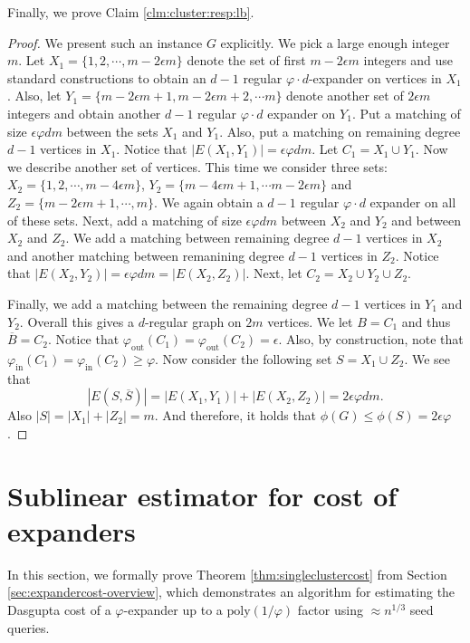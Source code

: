 \documentclass[letterpaper,11pt]{article}
\theoremstyle{plain}
\theoremstyle{definition}
\theoremstyle{remark}
\newcommand{\e}{\epsilon}
\newcommand{\poly}{\text{poly}}
\begin{document}
Finally, we prove Claim \ref{clm:cluster:resp:lb}. 
\clmclusterresp*
\begin{proof}
	We present such an instance $G$ explicitly. We pick a large enough integer $m$.
	Let $X_1 = \{1, 2, \cdots, m - 2 \e m\}$ denote the set of first $m - 2 \e m$ integers
	and use standard constructions to obtain an $d-1$ regular $\varphi \cdot d$-expander on vertices
	in $X_1$. Also, let $Y_1 = \{m - 2 \e m + 1, m -2\e m + 2, \cdots m\}$ denote
another set of $2 \e m$ integers and obtain another $d-1$ regular $\varphi \cdot d$ expander on 
	$Y_1$. Put a matching of size $\e \varphi dm$ between the sets $X_1$ and $Y_1$. Also, put 
	a matching on remaining degree $d-1$ vertices in $X_1$. Notice that $|E(X_1,Y_1)| = \e \varphi dm$.
	Let $C_1 = X_1 \cup Y_1$. Now we describe another set of vertices. 
	This time we consider three sets: $X_2 = \{1, 2, \cdots, m - 4 \e m\}$, 
	$Y_2 = \{m - 4 \e m + 1, \cdots m -2 \e m\}$ and $Z_2 = \{m - 2 \e m  + 1, \cdots, m\}$.
	We again obtain a $d-1$ regular $\varphi \cdot d$ expander on all of these sets. Next, add a matching
	of size $\e \varphi dm$ between $X_2$ and $Y_2$ and between $X_2$ and $Z_2$.
	We add a matching between remaining degree $d-1$ vertices in $X_2$ and
	another matching between remanining degree $d-1$ vertices in $Z_2$. 
	Notice that $|E(X_2, Y_2)| = \e \varphi dm = |E(X_2, Z_2)|$. Next, let
	$C_2 = X_2 \cup Y_2 \cup Z_2$.

	Finally, we add a matching between the remaining degree $d-1$ vertices in $Y_1$ and $Y_2$.
	Overall this gives a $d$-regular graph on $2m$ vertices. We let $B = C_1$ and 
	thus $\overline{B} = C_2$. Notice that 
	$\varphi_{\text{out}}(C_1) = \varphi_{\text{out}}(C_2) = \e$. Also, by construction,
	note that $\varphi_{\text{in}}(C_1) = \varphi_{\text{in}}(C_2) \geq \varphi$.
	Now consider the following set $S = X_1 \cup Z_2$. We see that 
	$$|E(S, \overline{S})| = |E(X_1, Y_1)| + |E(X_2, Z_2)| = 2 \e \varphi dm.$$
	Also $|S| = |X_1| + |Z_2| = m$.  And therefore, it holds
	that $\phi(G) \leq \phi(S) = 2 \e \varphi$.
\end{proof}
 
\section{Sublinear estimator for cost of expanders}
\label{sec:exp-cost}
In this section, we formally prove Theorem \ref{thm:singleclustercost} from Section \ref{sec:expandercost-overview}, which demonstrates an algorithm for estimating the Dasgupta cost of a $\varphi$-expander up to a $\poly(1/\varphi)$ factor using $\approx n^{1/3}$ seed queries. 
\end{document}

